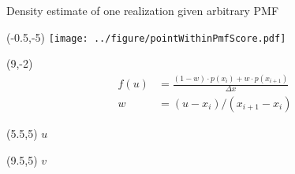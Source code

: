 \documentclass[aspectratio=169]{beamer}
\begin{document}
\begin{frame}{Density estimate of one realization given arbitrary PMF}

\begin{textblock}{1}(-0.5,-5)
\texttt{[image: ../figure/pointWithinPmfScore.pdf]}
\end{textblock}


\begin{textblock}{5}(9,-2)
\begin{equation*}
\begin{split}
f(u) &= \frac{(1-w)\cdot p(x_i) + w\cdot p(x_{i+1})}{\Delta x}\\
w &= (u - x_i) / (x_{i+1} - x_i)
\end{split}
\end{equation*}
\end{textblock}

\begin{textblock}{1}(5.5,5)
\small$u$
\end{textblock}

\begin{textblock}{1}(9.5,5)
\small$v$
\end{textblock}


\end{frame}
\end{document}
